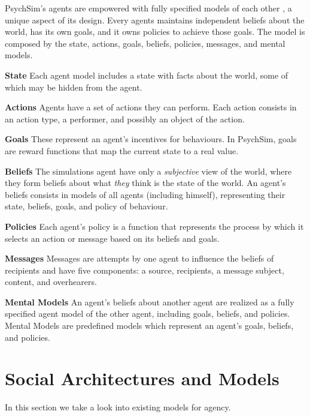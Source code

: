 PsychSim's agents are empowered with fully specified models of each other \cite{pynadath:modellingtheoryofmind}, a unique aspect of its design. Every agents maintains independent beliefs about the world, has its own goals, and it owns policies to achieve those goals. The model is composed by the state, actions, goals, beliefs, policies, messages, and mental models.

\begin{description}
\item \textbf{State} Each agent model includes a state with facts about the world, some of which may be hidden from the agent.
\item \textbf{Actions} Agents have a set of actions they can perform. Each action consists in an action type, a performer, and possibly an object of the action.
\item \textbf{Goals} These represent an agent's incentives for behaviours. In PsychSim, goals are reward functions that map the current state to a real value.
\item \textbf{Beliefs} The simulations agent have only a \textit{subjective} view of the world, where they form beliefs about what \textit{they} think is the state of the world. An agent's beliefs consists in models of all agents (including himself), representing their state, beliefs, goals, and policy of behaviour.
\item \textbf{Policies} Each agent's policy is a function that represents the process by which it selects an action or message based on its beliefs and goals.
\item \textbf{Messages} Messages are attempts by one agent to influence the beliefs of recipients and have five components: a source, recipients, a message subject, content, and overhearers.
\item \textbf{Mental Models} An agent's beliefs about another agent are realized as a fully specified agent model of the other agent, including goals, beliefs, and policies. Mental Models are predefined models which represent an agent's goals, beliefs, and policies.
\end{description}

\section{Social Architectures and Models}

\noindent In this section we take a look into existing models for agency.


